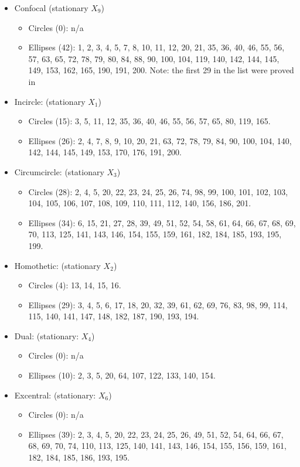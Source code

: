 \begin{itemize}
    \item Confocal (stationary $X_9$)
    \begin{itemize}
	\item Circles (0): n/a
	\item Ellipses (42): 1, 2, 3, 4, 5, 7, 8, 10, 11, 12, 20, 21, 35, 36, 40, 46, 55, 56, 57, 63, 65, 72, 78, 79, 80, 84, 88, 90, 100, 104, 119, 140, 142, 144, 145, 149, 153, 162, 165, 190, 191, 200. Note: the first 29 in the list were proved in \cite{garcia2020-ellipses}
	\end{itemize}
    \item Incircle: (stationary $X_1$)
    \begin{itemize}
    \item Circles (15): 3, 5, 11, 12, 35, 36, 40, 46, 55, 56, 57, 65, 80, 119, 165.
    \item Ellipses (26): 2, 4, 7, 8, 9, 10, 20, 21, 63, 72, 78, 79, 84, 90, 100, 104, 140, 142, 144, 145, 149, 153, 170, 176, 191, 200.
    \end{itemize}
    \item Circumcircle: (stationary $X_3$)
	\begin{itemize}
	\item Circles (28): 2, 4, 5, 20, 22, 23, 24, 25, 26, 74, 98, 99, 100, 101, 102, 103, 104, 105, 106, 107, 108, 109, 110, 111, 112, 140, 156, 186, 201.
	\item Ellipses (34): 6, 15, 21, 27, 28, 39, 49, 51, 52, 54, 58, 61, 64, 66, 67, 68, 69, 70, 113, 125, 141, 143, 146, 154, 155,  159, 161, 182, 184, 185, 193, 195, 199.
	\end{itemize}
    \item Homothetic: (stationary $X_2$)
	\begin{itemize}
    \item Circles (4): 13, 14, 15, 16.
	\item Ellipses (29): 3, 4, 5, 6, 17, 18, 20, 32, 39, 61, 62, 69, 76, 83, 98, 99, 114, 115, 140, 141, 147, 148, 182, 187, 190, 193, 194.
	\end{itemize}
	\item Dual: (stationary: $X_4$)
	\begin{itemize}
    \item Circles (0): n/a
    \item Ellipses (10): 2, 3, 5, 20, 64, 107, 122, 133, 140, 154.
    \end{itemize}
	\item Excentral: (stationary: $X_6$)
	\begin{itemize}
    \item Circles (0): n/a
    \item Ellipses (39): 2, 3, 4, 5, 20, 22, 23, 24, 25, 26, 49, 51, 52, 54, 64, 66, 67, 68, 69, 70, 74, 110, 113, 125, 140, 141, 143, 146, 154, 155, 156, 159, 161, 182, 184, 185, 186, 193, 195.

    \end{itemize}
\end{itemize}

